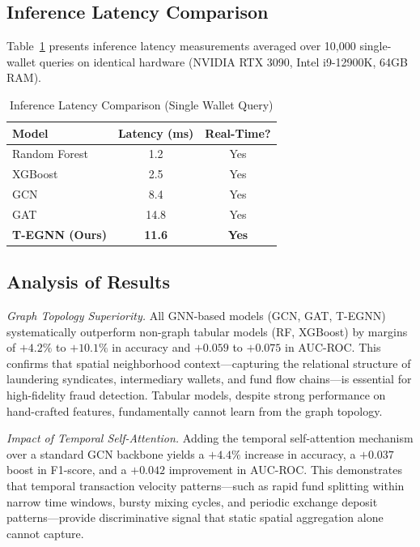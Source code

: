 \documentclass[conference]{IEEEtran}
\begin{document}
\subsection{Inference Latency Comparison}

Table~\ref{tab:latency} presents inference latency measurements averaged over 10,000 single-wallet queries on identical hardware (NVIDIA RTX 3090, Intel i9-12900K, 64GB RAM).

\begin{table}[htbp]
\caption{Inference Latency Comparison (Single Wallet Query)}
\label{tab:latency}
\centering
\small
\begin{tabular}{@{}lcc@{}}
\toprule
\textbf{Model} & \textbf{Latency (ms)} & \textbf{Real-Time?} \\
\midrule
Random Forest & 1.2 & Yes \\
XGBoost & 2.5 & Yes \\
GCN & 8.4 & Yes \\
GAT & 14.8 & Yes \\
\textbf{T-EGNN (Ours)} & \textbf{11.6} & \textbf{Yes} \\
\bottomrule
\end{tabular}
\end{table}

\subsection{Analysis of Results}

\textit{Graph Topology Superiority.} All GNN-based models (GCN, GAT, T-EGNN) systematically outperform non-graph tabular models (RF, XGBoost) by margins of $+4.2\%$ to $+10.1\%$ in accuracy and $+0.059$ to $+0.075$ in AUC-ROC. This confirms that spatial neighborhood context---capturing the relational structure of laundering syndicates, intermediary wallets, and fund flow chains---is essential for high-fidelity fraud detection. Tabular models, despite strong performance on hand-crafted features, fundamentally cannot learn from the graph topology.

\textit{Impact of Temporal Self-Attention.} Adding the temporal self-attention mechanism over a standard GCN backbone yields a $+4.4\%$ increase in accuracy, a $+0.037$ boost in F1-score, and a $+0.042$ improvement in AUC-ROC. This demonstrates that temporal transaction velocity patterns---such as rapid fund splitting within narrow time windows, bursty mixing cycles, and periodic exchange deposit patterns---provide discriminative signal that static spatial aggregation alone cannot capture.
\end{document}
